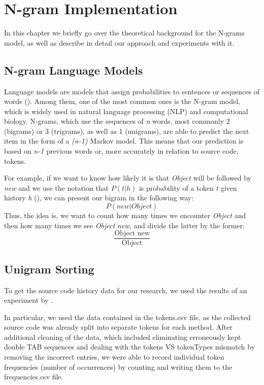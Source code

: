 \chapter{N-gram Implementation}
\label{chap:N-gram Implementation}

In this chapter we briefly go over the theoretical background for the N-grams model, as well as describe in detail our approach and experiments with it.
\section{N-gram Language Models}
Language models are models that assign probabilities to sentences or sequences of words (\cite{Jura09a}). Among them, one of the most common ones is the N-gram model, which is widely used in natural language processing (NLP) and computational biology. N-grams, which use the sequences of \textit{n} words, most commonly 2 (bigrams) or 3 (trigrams), as well as 1 (unigrams), are able to predict the next item in the form of a \textit{(n-1)} Markov model. This means that our prediction is based on \textit{n-1} previous words or, more accurately in relation to source code, tokens.

For example, if we want to know how likely it is that \textit{Object} will be followed by \textit{new} and we use the notation that $P(t|h)$ is probability of a token \textit{t} given history \textit{h} (\cite{Jura09a}), we can present our bigram in the following way:
\begin{equation}
    P(new|Object)
\end{equation}
Thus, the idea is, we want to count how many times we encounter \textit{Object} and then how many times we see \textit{Object new}, and divide the latter by the former:
\begin{equation}
    \frac{\text{Object new}}{\text{Object}}
\end{equation}

\section{Unigram Sorting}
To get the source code history data for our research, we used the results of an experiment by \cite{Zait20a}. 

In particular, we used the data contained in the tokens.csv file, as the collected source code was already split into separate tokens for each method. After additional cleaning of the data, which included eliminating erroneously kept double TAB sequences and dealing with the tokens VS tokenTypes mismatch by removing the incorrect entries, we were able to record individual token frequencies (number of occurrences) by counting and writing them to the frequencies.csv file.

